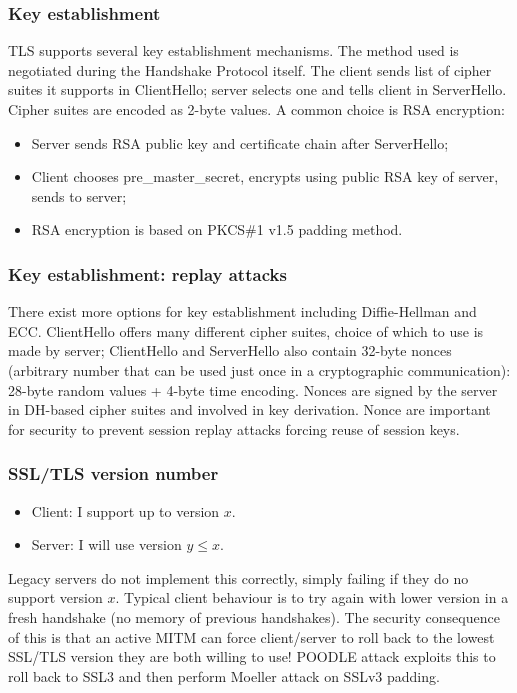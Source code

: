 \documentclass[a4paper, 10pt, titlepage]{article}
\begin{document}
\subsubsection{Key establishment}
TLS supports several key establishment mechanisms. The method used is negotiated during the Handshake Protocol itself. The client sends list of cipher suites it supports in ClientHello; server selects one and tells client in ServerHello. Cipher suites are encoded as 2-byte values. A common choice is RSA encryption:
\begin{itemize}
\item Server sends RSA public key and certificate chain after ServerHello;
\item Client chooses pre\_master\_secret, encrypts using public RSA key of server, sends to server;
\item RSA encryption is based on PKCS\#1 v1.5 padding method.
\end{itemize}

\subsubsection{Key establishment: replay attacks}
There exist more options for key establishment including Diffie-Hellman and ECC. ClientHello offers many different cipher suites, choice of which to use is made by server; ClientHello and ServerHello also contain 32-byte nonces (arbitrary number that can be used just once in a cryptographic communication): 28-byte random values + 4-byte time encoding. Nonces are signed by the server in DH-based cipher suites and involved in key derivation. Nonce are important for security to prevent session replay attacks forcing reuse of session keys.

\subsubsection{SSL/TLS version number}
\begin{itemize}
\item Client: I support up to version $x$.
\item Server: I will use version $y \leq x$.
\end{itemize}
Legacy servers do not implement this correctly, simply failing if they do no support version $x$. Typical client behaviour is to try again with lower version in a fresh handshake (no memory of previous handshakes). The security consequence of this is that an active MITM can force client/server to roll back to the lowest SSL/TLS version they are both willing to use! POODLE attack exploits this to roll back to SSL3 and then perform Moeller attack on SSLv3 padding.
\end{document}
